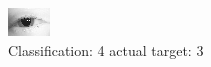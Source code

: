 \begin{figure}[h!]
\begin{center}
\includegraphics[width=0.60\columnwidth]{figures/ID120_class_4_target_3.png}
\end{center}
\caption{ Classification: 4 actual target: 3}
\label{fig:ID120_class_4_target_3}
\end{figure}
